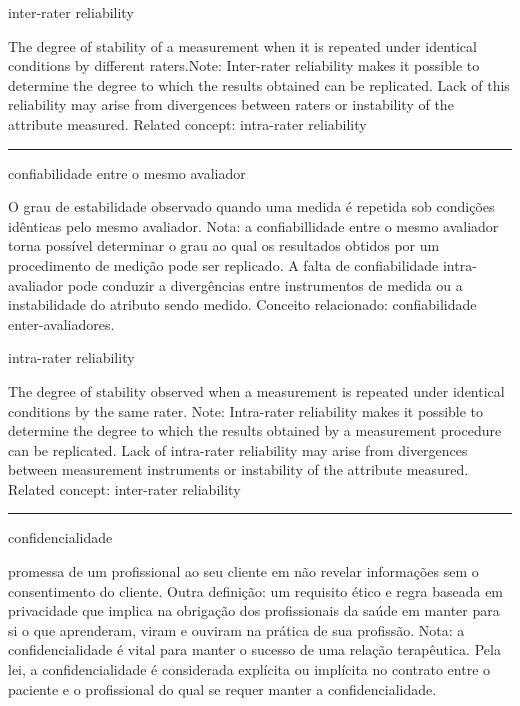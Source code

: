 \documentclass[
]{book}
\begin{document}
inter-rater reliability

The degree of stability of a measurement when it is repeated under identical conditions by different raters.Note: Inter-rater reliability makes it possible to determine the degree to which the results obtained can be replicated. Lack of this reliability may arise from divergences between raters or instability of the attribute measured. Related concept: intra-rater reliability

\begin{center}\rule{0.5\linewidth}{0.5pt}\end{center}

confiabilidade entre o mesmo avaliador

O grau de estabilidade observado quando uma medida é repetida sob condições idênticas pelo mesmo avaliador. Nota: a confiabillidade entre o mesmo avaliador torna possível determinar o grau ao qual os resultados obtidos por um procedimento de medição pode ser replicado. A falta de confiabilidade intra-avaliador pode conduzir a divergências entre instrumentos de medida ou a instabilidade do atributo sendo medido. Conceito relacionado: confiabilidade enter-avaliadores.

intra-rater reliability

The degree of stability observed when a measurement is repeated under identical conditions by the same rater. Note: Intra-rater reliability makes it possible to determine the degree to which the results obtained by a measurement procedure can be replicated. Lack of intra-rater reliability may arise from divergences between measurement instruments or instability of the attribute measured. Related concept: inter-rater reliability

\begin{center}\rule{0.5\linewidth}{0.5pt}\end{center}

confidencialidade

promessa de um profissional ao seu cliente em não revelar informações sem o consentimento do cliente. Outra definição: um requisito ético e regra baseada em privacidade que implica na obrigação dos profissionais da saúde em manter para si o que aprenderam, viram e ouviram na prática de sua profissão. Nota: a confidencialidade é vital para manter o sucesso de uma relação terapêutica. Pela lei, a confidencialidade é considerada explícita ou implícita no contrato entre o paciente e o profissional do qual se requer manter a confidencialidade.
\end{document}
